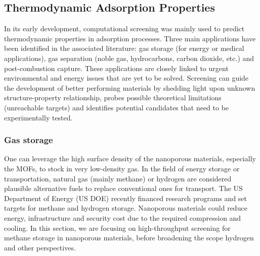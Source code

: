 \documentclass[main.tex]{subfiles}
\begin{document}
\subsection{Thermodynamic Adsorption Properties}

In its early development, computational screening was mainly used to predict thermodynamic properties in adsorption processes. Three main applications have been identified in the associated literature: gas storage (for energy or medical applications), gas separation (noble gas, hydrocarbons, carbon dioxide, etc.) and post-combustion  capture. These applications are closely linked to urgent environmental and energy issues that are yet to be solved. Screening can guide the development of better performing materials by shedding light upon unknown structure-property relationship, probes possible theoretical limitations (unreachable targets) and identifies potential candidates that need to be experimentally tested.

\subsubsection{Gas storage}

One can leverage the high surface density of the nanoporous materials, especially the MOFs, to stock in very low-density gas. In the field of energy storage or transportation, natural gas (mainly methane) or hydrogen are considered plausible alternative fuels to replace conventional ones for transport. The US Department of Energy (US DOE) recently financed research programs and set targets for methane and hydrogen storage. Nanoporous materials could reduce energy, infrastructure and security cost due to the required compression and cooling. In this section, we are focusing on high-throughput screening for methane storage in nanoporous materials, before broadening the scope hydrogen and other perspectives.
\end{document}
